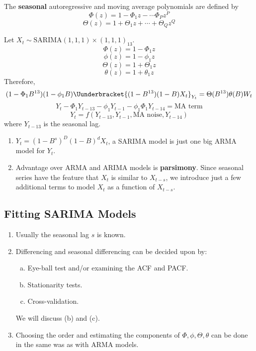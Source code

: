 \begin{Definition}{}{}
      The \textbf{seasonal} autoregressive and moving average polynomials are
      defined by
      \[ \Phi(z)=1-\Phi_1 z-\cdots \Phi_P z^P \]
      \[ \Theta(z)=1+\Theta_1 z+\cdots+\Theta_Q z^Q \]
\end{Definition}
\begin{Example}{}{}
      Let $ X_t \sim \text{SARIMA}(1,1,1)\times(1,1,1)_{13} $.
      \[ \Phi(z)=1-\Phi_1 z \]
      \[ \phi(z)=1-\phi_1 z \]
      \[ \Theta(z)=1+\Theta_1 z \]
      \[ \theta(z)=1+\theta_1 z \]
      Therefore,
      \[ (1-\Phi_1 B^{13})(1-\phi_1 B)\Uunderbracket{(1-B^{13})(1-B)X_t}_{Y_t}=\Theta(B^{13})\theta(B)W_t \]
      \[ Y_t-\Phi_1 Y_{t-13}-\phi_1 Y_{t-1}-\phi_1 \Phi_1 Y_{t-14}=\text{MA term} \]
      \[ Y_t=f(Y_{t-13},Y_{t-1},\text{MA noise}, Y_{t-14}) \]
      where $ Y_{t-13} $ is the seasonal lag.
\end{Example}
\begin{Remark}{}{}
      \begin{enumerate}[(1)]
            \item $ Y_t=(1-B^s)^D(1-B)^d X_t $, a SARIMA model is just one big ARMA
                  model for $ Y_t $.
            \item Advantage over ARMA and ARIMA models is \textbf{parsimony}.
                  Since seasonal series have the feature that $ X_t $ is similar to $ X_{t-s} $,
                  we introduce just a few additional terms to model $ X_t $ as a function of
                  $ X_{t-s} $.
      \end{enumerate}
\end{Remark}
\subsection*{Fitting SARIMA Models}
\begin{enumerate}[(1)]
      \item Usually the seasonal lag $ s $ is known.
      \item Differencing and seasonal differencing can be decided upon by:
            \begin{enumerate}[(a)]
                  \item Eye-ball test and/or examining the ACF and PACF\@.
                  \item Stationarity tests.
                  \item Cross-validation.
            \end{enumerate}
            {\color{blue}We will discuss (b) and (c).}
      \item Choosing the order and estimating the components of $ \Phi,\phi,\Theta,\theta $
            can be done in the same was as with ARMA models.
\end{enumerate}

